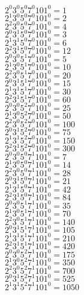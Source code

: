 \documentclass{article}
\begin{document}
\noindent $2^{0}3^{0}5^{0}7^{0}101^{0}=1$\\
$2^{1}3^{0}5^{0}7^{0}101^{0}=2$\\
$2^{2}3^{0}5^{0}7^{0}101^{0}=4$\\
$2^{0}3^{1}5^{0}7^{0}101^{0}=3$\\
$2^{1}3^{1}5^{0}7^{0}101^{0}=6$\\
$2^{2}3^{1}5^{0}7^{0}101^{0}=12$\\
$2^{0}3^{0}5^{1}7^{0}101^{0}=5$\\
$2^{1}3^{0}5^{1}7^{0}101^{0}=10$\\
$2^{2}3^{0}5^{1}7^{0}101^{0}=20$\\
$2^{0}3^{1}5^{1}7^{0}101^{0}=15$\\
$2^{1}3^{1}5^{1}7^{0}101^{0}=30$\\
$2^{2}3^{1}5^{1}7^{0}101^{0}=60$\\
$2^{0}3^{0}5^{2}7^{0}101^{0}=25$\\
$2^{1}3^{0}5^{2}7^{0}101^{0}=50$\\
$2^{2}3^{0}5^{2}7^{0}101^{0}=100$\\
$2^{0}3^{1}5^{2}7^{0}101^{0}=75$\\
$2^{1}3^{1}5^{2}7^{0}101^{0}=150$\\
$2^{2}3^{1}5^{2}7^{0}101^{0}=300$\\
$2^{0}3^{0}5^{0}7^{1}101^{0}=7$\\
$2^{1}3^{0}5^{0}7^{1}101^{0}=14$\\
$2^{2}3^{0}5^{0}7^{1}101^{0}=28$\\
$2^{0}3^{1}5^{0}7^{1}101^{0}=21$\\
$2^{1}3^{1}5^{0}7^{1}101^{0}=42$\\
$2^{2}3^{1}5^{0}7^{1}101^{0}=84$\\
$2^{0}3^{0}5^{1}7^{1}101^{0}=35$\\
$2^{1}3^{0}5^{1}7^{1}101^{0}=70$\\
$2^{2}3^{0}5^{1}7^{1}101^{0}=140$\\
$2^{0}3^{1}5^{1}7^{1}101^{0}=105$\\
$2^{1}3^{1}5^{1}7^{1}101^{0}=210$\\
$2^{2}3^{1}5^{1}7^{1}101^{0}=420$\\
$2^{0}3^{0}5^{2}7^{1}101^{0}=175$\\
$2^{1}3^{0}5^{2}7^{1}101^{0}=350$\\
$2^{2}3^{0}5^{2}7^{1}101^{0}=700$\\
$2^{0}3^{1}5^{2}7^{1}101^{0}=525$\\
$2^{1}3^{1}5^{2}7^{1}101^{0}=1050$\\
\end{document}
